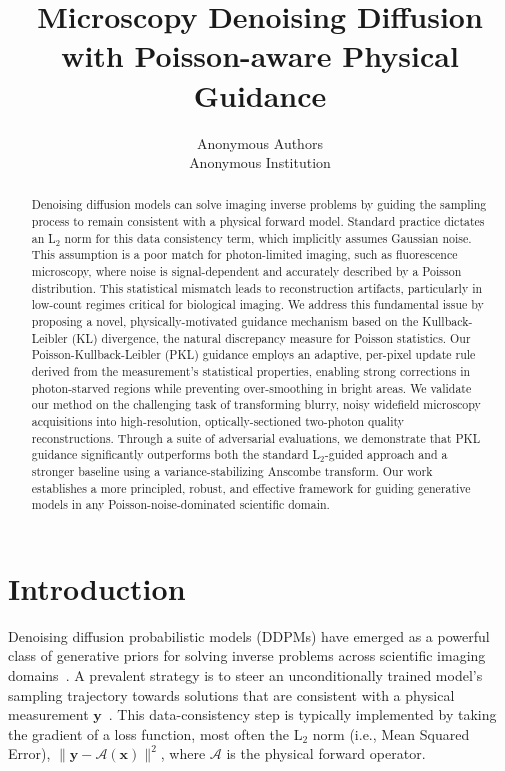 \documentclass{article}
\title{Microscopy Denoising Diffusion with Poisson-aware Physical Guidance}
\author{Anonymous Authors\\
Anonymous Institution}
\begin{document}
\maketitle

\begin{abstract}
Denoising diffusion models can solve imaging inverse problems by guiding the sampling process to remain consistent with a physical forward model. Standard practice dictates an L$_2$ norm for this data consistency term, which implicitly assumes Gaussian noise. This assumption is a poor match for photon-limited imaging, such as fluorescence microscopy, where noise is signal-dependent and accurately described by a Poisson distribution. This statistical mismatch leads to reconstruction artifacts, particularly in low-count regimes critical for biological imaging. We address this fundamental issue by proposing a novel, physically-motivated guidance mechanism based on the Kullback-Leibler (KL) divergence, the natural discrepancy measure for Poisson statistics. Our Poisson-Kullback-Leibler (PKL) guidance employs an adaptive, per-pixel update rule derived from the measurement's statistical properties, enabling strong corrections in photon-starved regions while preventing over-smoothing in bright areas. We validate our method on the challenging task of transforming blurry, noisy widefield microscopy acquisitions into high-resolution, optically-sectioned two-photon quality reconstructions. Through a suite of adversarial evaluations, we demonstrate that PKL guidance significantly outperforms both the standard L$_2$-guided approach and a stronger baseline using a variance-stabilizing Anscombe transform. Our work establishes a more principled, robust, and effective framework for guiding generative models in any Poisson-noise-dominated scientific domain.
\end{abstract}

\section{Introduction}
\label{sec:intro}
Denoising diffusion probabilistic models (DDPMs) have emerged as a powerful class of generative priors for solving inverse problems across scientific imaging domains~\cite{ho2020ddpm, song2022solving}. A prevalent strategy is to steer an unconditionally trained model's sampling trajectory towards solutions that are consistent with a physical measurement $\mathbf{y}$~\cite{chung2022diffusion}. This data-consistency step is typically implemented by taking the gradient of a loss function, most often the L$_2$ norm (i.e., Mean Squared Error), $\|\mathbf{y} - \mathcal{A}(\mathbf{x})\|^2$, where $\mathcal{A}$ is the physical forward operator.
\end{document}
